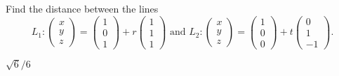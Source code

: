 
\begin{Exercise}[
name={},
title={}, 
difficulty=0,
origin={\cite{AG}}]
Find the distance between the lines
\[
L_1:
\begin{pmatrix}
x\\
y\\
z
\end{pmatrix}
=
\begin{pmatrix}
1\\
0\\
1
\end{pmatrix}
+r\begin{pmatrix}
1\\
1\\
1
\end{pmatrix}
\text{ and }
L_2:
\begin{pmatrix}
x\\
y\\
z
\end{pmatrix}
=
\begin{pmatrix}
1\\
0\\
0
\end{pmatrix}
+t\begin{pmatrix}
0\\
1\\
-1
\end{pmatrix}.
\] 
\end{Exercise}
\begin{Answer}
$\sqrt{6}/6$
\end{Answer}
